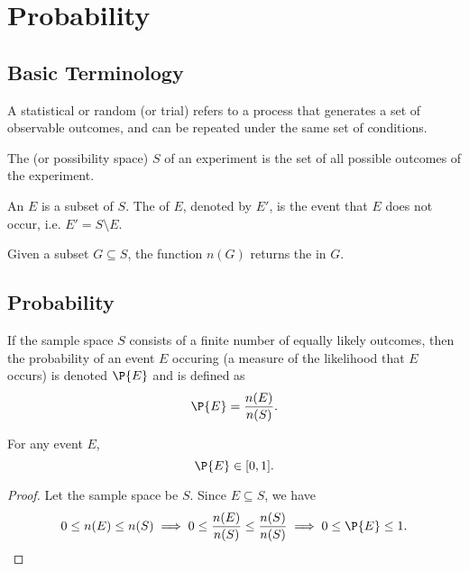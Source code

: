\chapter{Probability}\label{chap:Probability}

\section{Basic Terminology}

\begin{definition}
    A statistical or random  (or trial) refers to a process that generates a set of observable outcomes, and can be repeated under the same set of conditions.
\end{definition}

\begin{definition}
    The  (or possibility space) $S$ of an experiment is the set of all possible outcomes of the experiment.
\end{definition}

\begin{definition}
    An  $E$ is a subset of $S$. The  of $E$, denoted by $E'$, is the event that $E$ does not occur, i.e. $E' = S \setminus E$.
\end{definition}

\begin{definition}
    Given a subset $G \subseteq S$, the function $n(G)$ returns the  in $G$.
\end{definition}

\section{Probability}

\begin{definition}
    If the sample space $S$ consists of a finite number of equally likely outcomes, then the probability of an event $E$ occuring (a measure of the likelihood that $E$ occurs) is denoted $\P{E}$ and is defined as \[\P{E} = \frac{n(E)}{n(S)}.\]
\end{definition}

\begin{proposition}
    For any event $E$, \[\P{E} \in [0, 1].\]
\end{proposition}
\begin{proof}
    Let the sample space be $S$. Since $E \subseteq S$, we have \[0 \leq n(E) \leq n(S) \implies 0 \leq \frac{n(E)}{n(S)} \leq \frac{n(S)}{n(S)} \implies 0 \leq \P{E} \leq 1.\]
\end{proof}

